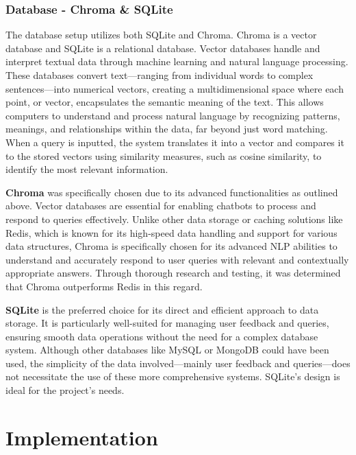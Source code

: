 \documentclass{l4proj}
\begin{document}
\subsection{Database - Chroma \& SQLite}

The database setup utilizes both SQLite and Chroma. Chroma is a vector database and SQLite is a relational database. Vector databases handle and interpret textual data through machine learning and natural language processing. These databases convert text—ranging from individual words to complex sentences—into numerical vectors, creating a multidimensional space where each point, or vector, encapsulates the semantic meaning of the text. This allows computers to understand and process natural language by recognizing patterns, meanings, and relationships within the data, far beyond just word matching. When a query is inputted, the system translates it into a vector and compares it to the stored vectors using similarity measures, such as cosine similarity, to identify the most relevant information. 

\textbf{Chroma} was specifically chosen due to its advanced functionalities as outlined above. Vector databases are essential for enabling chatbots to process and respond to queries effectively. Unlike other data storage or caching solutions like Redis, which is known for its high-speed data handling and support for various data structures, Chroma is specifically chosen for its advanced NLP abilities to understand and accurately respond to user queries with relevant and contextually appropriate answers. Through thorough research and testing, it was determined that Chroma outperforms Redis in this regard.

\textbf{SQLite} is the preferred choice for its direct and efficient approach to data storage. It is particularly well-suited for managing user feedback and queries, ensuring smooth data operations without the need for a complex database system. Although other databases like MySQL or MongoDB could have been used, the simplicity of the data involved—mainly user feedback and queries—does not necessitate the use of these more comprehensive systems. SQLite's design is ideal for the project's needs.


\chapter{Implementation}
\end{document}
